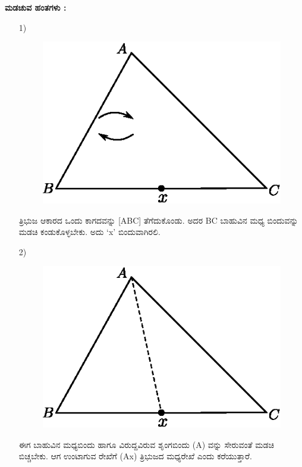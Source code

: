 \begin{enumerate}
 \medskip
    \noindent
 \textbf{ಮಡಚುವ ಹಂತಗಳು :}
 
 \begin{itemize}
 \item[1)] 
 ~
 \begin{figure}[H]
\centering
\includegraphics[scale=.98]{src/figure/chap1/fig1-36a.eps}
\end{figure}
 
ತ್ರಿಭುಜ ಆಕಾರದ ಒಂದು ಕಾಗದವನ್ನು [ABC] ತೆಗೆದುಕೊಂಡು. ಅದರ BC ಬಾಹುವಿನ ಮಧ್ಯ ಬಿಂದುವನ್ನು ಮಡಚಿ ಕಂಡುಕೊಳ್ಳಬೇಕು. ಅದು  `x' ಬಿಂದುವಾಗಿರಲಿ. 
 
 \item[2)]
 ~
 \begin{figure}[H]
\centering
\includegraphics[scale=.98]{src/figure/chap1/fig1-36b.eps}
\end{figure}
 
 ಈಗ ಬಾಹುವಿನ ಮಧ್ಯಬಿಂದು ಹಾಗೂ ವಿರುದ್ದವಿರುವ ಶೃಂಗಬಿಂದು (A) ವನ್ನು ಸೇರುವಂತೆ ಮಡಚಿ ಬಿಚ್ಚಬೇಕು. ಆಗ ಉಂಟಾಗುವ ರೇಖೆಗೆ (Ax) ತ್ರಿಭುಜದ ಮಧ್ಯರೇಖೆ ಎಂದು ಕರೆಯುತ್ತಾರೆ. 
 

\end{itemize}
\end{enumerate}
